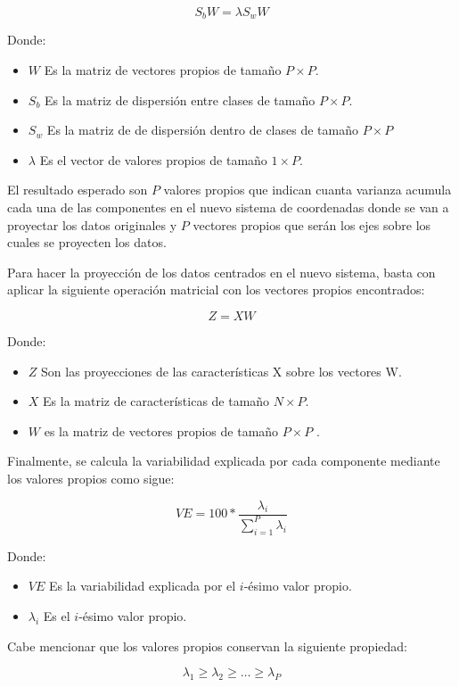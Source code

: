 \documentclass[11pt, letterpaper]{article}
\begin{document}
$$S_bW = \lambda S_wW$$

Donde: 

\begin{itemize}
	\item $W$ Es la matriz de vectores propios de tamaño $P \times P$.
	\item $S_b$ Es la matriz de dispersión entre clases de tamaño $P\times P$.
	\item $S_w$ Es la matriz de de dispersión dentro de clases de tamaño $P \times P$
	\item $\lambda$ Es el vector de valores propios de tamaño $1 \times P$.
\end{itemize}

El resultado esperado son $P$ valores propios que indican cuanta varianza acumula cada una de las componentes en el nuevo sistema de coordenadas donde se van a proyectar los datos originales y $P$ vectores propios que serán los ejes sobre los cuales se proyecten los datos.

Para hacer la proyección de los datos centrados en el nuevo sistema, basta con aplicar la siguiente operación matricial con los vectores propios encontrados:

$$Z = XW$$

Donde: 
\begin{itemize}
	\item $Z$ Son las proyecciones de las características X sobre los vectores W.
	\item $X$ Es la matriz de características de tamaño $N \times P$.
	\item $W$ es la matriz de vectores propios de tamaño $P \times P$ .
\end{itemize}

Finalmente, se calcula la variabilidad explicada por cada componente mediante los valores propios como sigue:

$$VE = 100*\frac{\lambda_i}{\sum_{i = 1}^P{\lambda_i}}$$

Donde: 

\begin{itemize}
	\item $VE$ Es la variabilidad explicada por el $i$-ésimo valor propio.
	\item $\lambda_i$ Es el $i$-ésimo valor propio.
\end{itemize}

Cabe mencionar que los valores propios conservan la siguiente propiedad:

$$\lambda_1 \geq \lambda_2 \geq \dots \geq \lambda_P$$
\end{document}

